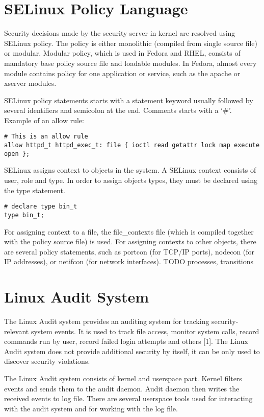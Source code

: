 \section{SELinux Policy Language}
Security decisions made by the security server in kernel are resolved using SELinux policy. The policy is either monolithic (compiled from single source file) or modular. Modular policy, which is used in Fedora and RHEL, consists of mandatory base policy source file and loadable modules. In Fedora, almost every module contains policy for one application or service, such as the apache or xserver modules.

SELinux policy statements starts with a statement keyword usually followed by
several identifiers and semicolon at the end. Comments starts with a ‘\#’. Example of an allow rule:

\begin{lstlisting}
# This is an allow rule
allow httpd_t httpd_exec_t: file { ioctl read getattr lock map execute open };
\end{lstlisting}

SELinux assigns context to objects in the system. A SELinux context consists of user, role and type. In order to assign objects types, they must be declared using the type statement.

\begin{lstlisting}
# declare type bin_t
type bin_t;
\end{lstlisting}

For assigning context to a file, the file\_contexts file (which is compiled together with the policy source file) is used. For assigning contexts to other objects, there are several policy statements, such as portcon (for TCP/IP ports), nodecon (for IP addresses), or netifcon (for network interfaces).
TODO processes, transitions

\section{Linux Audit System}
The Linux Audit system provides an auditing system for tracking security-relevant system events. It is used to track file access, monitor system calls, record commands run by user, record failed login attempts and others [1]. The Linux Audit system does not provide additional security by itself, it can be only used to discover security violations.

The Linux Audit system consists of kernel and userspace part. Kernel filters events and sends them to the audit daemon. Audit daemon then writes the received events to log file. There are several userspace tools used for interacting with the audit system and for working with the log file.


